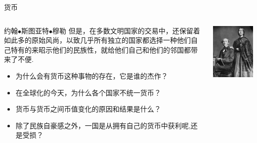 \documentclass[10pt,hyperref={CJKbookmarks=true},xcolor=dvipsnames,aspectratio=169]{beamer}
\begin{document}
\begin{frame}{货币}
\begin{columns}
	\begin{column}{0.7\textwidth}
		\begin{block}{约翰$\bullet$斯图亚特$\bullet$穆勒}
			但是，在多数文明国家的交易中，还保留着如此多的原始风尚，以致几乎所有独立的国家都选择一种他们自己特有的来昭示他们的民族性，就给他们自己和他们的邻国都带来了不便.
		\end{block}
	\begin{itemize}
		\item 为什么会有货币这种事物的存在，它是谁的杰作？
		\item 在全球化的今天，为什么各个国家不统一货币？
		\item 货币与货币之间币值变化的原因和结果是什么？
		\item 除了民族自豪感之外，一国是从拥有自己的货币中获利呢,还是受损？
	\end{itemize}
	\end{column}
		\begin{column}{0.3\textwidth}
		\centering
		\includegraphics[scale=2]{fig/bop/mill}
	\end{column}
\end{columns}
	
\end{frame}
\end{document}
